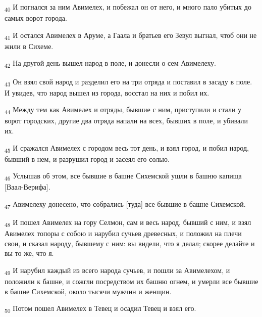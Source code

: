 \begin{tcolorbox}
\textsubscript{40} И погнался за ним Авимелех, и побежал он от него, и много пало убитых до самых ворот города.
\end{tcolorbox}
\begin{tcolorbox}
\textsubscript{41} И остался Авимелех в Аруме, а Гаала и братьев его Зевул выгнал, чтоб они не жили в Сихеме.
\end{tcolorbox}
\begin{tcolorbox}
\textsubscript{42} На другой день вышел народ в поле, и донесли о сем Авимелеху.
\end{tcolorbox}
\begin{tcolorbox}
\textsubscript{43} Он взял свой народ и разделил его на три отряда и поставил в засаду в поле. И увидев, что народ вышел из города, восстал на них и побил их.
\end{tcolorbox}
\begin{tcolorbox}
\textsubscript{44} Между тем как Авимелех и отряды, бывшие с ним, приступили и стали у ворот городских, другие два отряда напали на всех, бывших в поле, и убивали их.
\end{tcolorbox}
\begin{tcolorbox}
\textsubscript{45} И сражался Авимелех с городом весь тот день, и взял город, и побил народ, бывший в нем, и разрушил город и засеял его солью.
\end{tcolorbox}
\begin{tcolorbox}
\textsubscript{46} Услышав об этом, все бывшие в башне Сихемской ушли в башню капища [Ваал-Верифа].
\end{tcolorbox}
\begin{tcolorbox}
\textsubscript{47} Авимелеху донесено, что собрались [туда] все бывшие в башне Сихемской.
\end{tcolorbox}
\begin{tcolorbox}
\textsubscript{48} И пошел Авимелех на гору Селмон, сам и весь народ, бывший с ним, и взял Авимелех топоры с собою и нарубил сучьев древесных, и положил на плечи свои, и сказал народу, бывшему с ним: вы видели, что я делал; скорее делайте и вы то же, что я.
\end{tcolorbox}
\begin{tcolorbox}
\textsubscript{49} И нарубил каждый из всего народа сучьев, и пошли за Авимелехом, и положили к башне, и сожгли посредством их башню огнем, и умерли все бывшие в башне Сихемской, около тысячи мужчин и женщин.
\end{tcolorbox}
\begin{tcolorbox}
\textsubscript{50} Потом пошел Авимелех в Тевец и осадил Тевец и взял его.
\end{tcolorbox}
